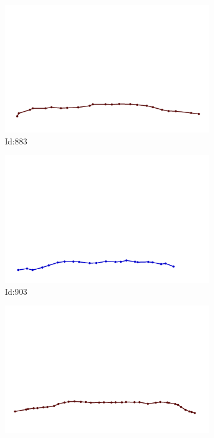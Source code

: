 \documentclass[12pt,twoside]{report}
\begin{document}
\begin{figure}
\begin{subfigure}[b]{0.20\textwidth}
\centering
\includegraphics[width=\textwidth]{../trajectories/883.png}
\caption{Id:883}
\end{subfigure}
\begin{subfigure}[b]{0.20\textwidth}
\centering
\includegraphics[width=\textwidth]{../trajectories/903.png}
\caption{Id:903}
\end{subfigure}
\begin{subfigure}[b]{0.20\textwidth}
\centering
\includegraphics[width=\textwidth]{../trajectories/904.png}

\end{subfigure}
\end{figure}
\end{document}
